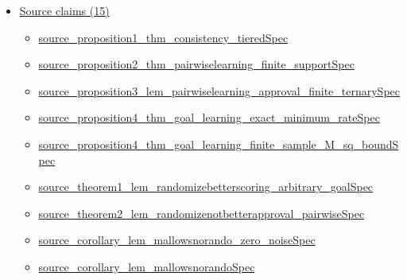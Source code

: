 \documentclass[10pt]{article}
\begin{document}
\begin{itemize}[leftmargin=1.2em]
\begin{itemize}[leftmargin=1.2em]
\item \hyperlink{paper-prerequisite-de0bf2a40489a6d5}{GGSG19\allowbreak{}Top\allowbreak{}Three.\allowbreak{}ranking\allowbreak{}Prefix\allowbreak{}Score}
\item \hyperlink{paper-prerequisite-61b6736a43b1819d}{GGSG19\allowbreak{}Top\allowbreak{}Three.\allowbreak{}ranking\allowbreak{}Uniform\allowbreak{}Tie\allowbreak{}Signal\allowbreak{}Law}
\end{itemize}
\item \hyperlink{source-section-f10b5f68e4acf3dc}{Source claims (15)}
\begin{itemize}[leftmargin=1.2em]
\item \hyperlink{source-claim-80ef2800a9578ca5}{source\_\allowbreak{}proposition1\_\allowbreak{}thm\_\allowbreak{}consistency\_\allowbreak{}tiered\allowbreak{}Spec}
\item \hyperlink{source-claim-c74374c73696b398}{source\_\allowbreak{}proposition2\_\allowbreak{}thm\_\allowbreak{}pairwiselearning\_\allowbreak{}finite\_\allowbreak{}support\allowbreak{}Spec}
\item \hyperlink{source-claim-baeee6d035a90ee1}{source\_\allowbreak{}proposition3\_\allowbreak{}lem\_\allowbreak{}pairwiselearning\_\allowbreak{}approval\_\allowbreak{}finite\_\allowbreak{}ternary\allowbreak{}Spec}
\item \hyperlink{source-claim-2576e5b507810949}{source\_\allowbreak{}proposition4\_\allowbreak{}thm\_\allowbreak{}goal\_\allowbreak{}learning\_\allowbreak{}exact\_\allowbreak{}minimum\_\allowbreak{}rate\allowbreak{}Spec}
\item \hyperlink{source-claim-6a7da73327f0abda}{source\_\allowbreak{}proposition4\_\allowbreak{}thm\_\allowbreak{}goal\_\allowbreak{}learning\_\allowbreak{}finite\_\allowbreak{}sample\_\allowbreak{}M\_\allowbreak{}sq\_\allowbreak{}bound\allowbreak{}Spec}
\item \hyperlink{source-claim-f4c362962779355c}{source\_\allowbreak{}theorem1\_\allowbreak{}lem\_\allowbreak{}randomizebetterscoring\_\allowbreak{}arbitrary\_\allowbreak{}goal\allowbreak{}Spec}
\item \hyperlink{source-claim-82eaa4a544e4300f}{source\_\allowbreak{}theorem2\_\allowbreak{}lem\_\allowbreak{}randomizenotbetterapproval\_\allowbreak{}pairwise\allowbreak{}Spec}
\item \hyperlink{source-claim-c1058349a9163721}{source\_\allowbreak{}corollary\_\allowbreak{}lem\_\allowbreak{}mallowsnorando\_\allowbreak{}zero\_\allowbreak{}noise\allowbreak{}Spec}
\item \hyperlink{source-claim-57ef0e97610a7efd}{source\_\allowbreak{}corollary\_\allowbreak{}lem\_\allowbreak{}mallowsnorando\allowbreak{}Spec}

\end{itemize}
\end{itemize}
\end{document}
